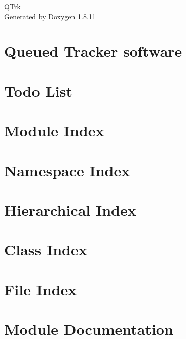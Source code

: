 \documentclass[twoside]{book}
\newcommand{\+}{\discretionary{\mbox{\scriptsize$\hookleftarrow$}}{}{}}
\newcommand{\clearemptydoublepage}{%
  \newpage{\pagestyle{empty}\cleardoublepage}%
}
\begin{document}
\hypersetup{pageanchor=false,
             bookmarksnumbered=true,
             pdfencoding=unicode
            }
\begin{titlepage}
\vspace*{7cm}
\begin{center}%
{\Large Q\+Trk }\\
\vspace*{1cm}
{\large Generated by Doxygen 1.8.11}\\
\end{center}
\end{titlepage}
\clearemptydoublepage
\tableofcontents
\clearemptydoublepage
{}
\hypersetup{pageanchor=true}

\chapter{Queued Tracker software}
\label{index}\hypertarget{index}{}
\chapter{Todo List}
\label{todo}
\hypertarget{todo}{}

\chapter{Module Index}

\chapter{Namespace Index}

\chapter{Hierarchical Index}

\chapter{Class Index}

\chapter{File Index}

\chapter{Module Documentation}





\end{document}
